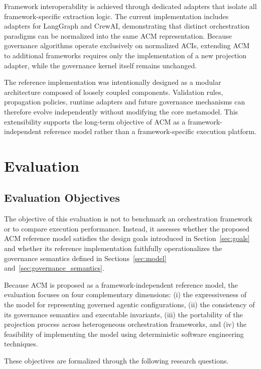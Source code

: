 \documentclass[10pt]{article}
\begin{document}
Framework interoperability is achieved through dedicated adapters that isolate all framework-specific extraction logic. The current implementation includes adapters for LangGraph and CrewAI, demonstrating that distinct orchestration paradigms can be normalized into the same ACM representation. Because governance algorithms operate exclusively on normalized ACIs, extending ACM to additional frameworks requires only the implementation of a new projection adapter, while the governance kernel itself remains unchanged.

The reference implementation was intentionally designed as a modular architecture composed of loosely coupled components. Validation rules, propagation policies, runtime adapters and future governance mechanisms can therefore evolve independently without modifying the core metamodel. This extensibility supports the long-term objective of ACM as a framework-independent reference model rather than a framework-specific execution platform.

\section{Evaluation}
\label{sec:evaluation}
\subsection{Evaluation Objectives}
\label{sec:evaluation_objectives}

The objective of this evaluation is not to benchmark an orchestration framework or to compare execution performance. Instead, it assesses whether the proposed ACM reference model satisfies the design goals introduced in Section~\ref{sec:goals} and whether its reference implementation faithfully operationalizes the governance semantics defined in Sections~\ref{sec:model} and~\ref{sec:governance_semantics}.

Because ACM is proposed as a framework-independent reference model, the evaluation focuses on four complementary dimensions: (i) the expressiveness of the model for representing governed agentic configurations, (ii) the consistency of its governance semantics and executable invariants, (iii) the portability of the projection process across heterogeneous orchestration frameworks, and (iv) the feasibility of implementing the model using deterministic software engineering techniques.

These objectives are formalized through the following research questions.
\end{document}
